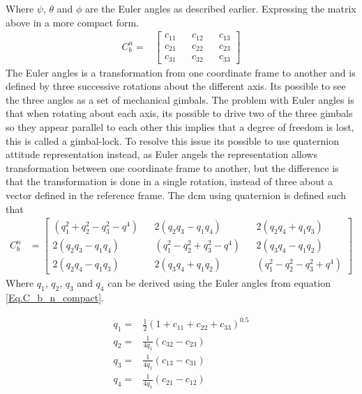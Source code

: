 Where $\psi$, $\theta$ and $\phi$ are the Euler angles as described earlier. Expressing the matrix above in a more compact form.
\begin{align}
C_b^n = &
\begin{bmatrix}
c_{11} && c_{12} && c_{13}\\
c_{21} && c_{22} && c_{23} \\
c_{31} && c_{32} && c_{33}
\end{bmatrix}
\label{Eq.C_b_n_compact}
\end{align}
The Euler angles is a transformation from one coordinate frame to another and is defined by three successive rotations about the different axis. Its possible to see the three angles as a set of mechanical gimbals. 
The problem with Euler angles is that when rotating about each axis, its possible to drive two of the three gimbals so they appear parallel to each other this implies that a degree of freedom is lost, this is called a gimbal-lock\cite{nonlinear}. To resolve this issue its possible to use quaternion attitude representation instead, as Euler angels the representation allows transformation between one coordinate frame to another, but the difference is that the transformation is done in a single rotation, instead of three about a vector defined in the reference frame. The \gls{dcm} using quaternion is defined such that
\begin{align}
C_b^n & =
\begin{bmatrix}
(q_1^2 + q_2^2 - q_3^2-q^4) && 2(q_2q_3 - q_1q_4) && 2(q_2q_4 + q_1q_3) \\
2(q_2q_3 - q_1q_4) && (q_1^2 - q_2^2 + q_3^2-q^4) && 2(q_3q_4 - q_1q_2) \\
2(q_2q_4 - q_1q_3) && 2(q_3q_4 + q_1q_2) && (q_1^2 - q_2^2 - q_3^2+q^4)
\end{bmatrix}
\end{align}
Where $q_1$, $q_2$, $q_3$ and $q_4$ can be derived using the Euler angles from equation \eqref{Eq.C_b_n_compact}.

\begin{align*}
q_1 =& \frac{1}{2}(1+c_{11} + c_{22} + c_{33})^{0.5} \\
q_2 =& \frac{1}{4q_1}(c_{32} - c_{23})\\
q_3 =& \frac{1}{4q_1}(c_{13} - c_{31})\\
q_4 =& \frac{1}{4q_1}(c_{21} - c_{12})\\
\end{align*}

